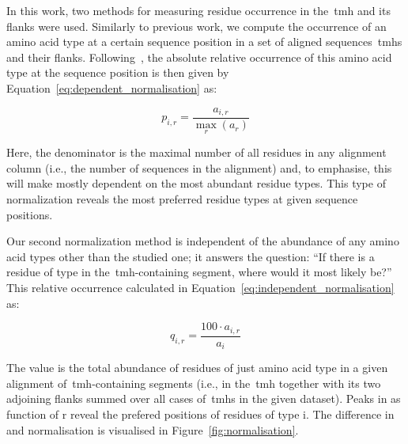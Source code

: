 In this work, two methods for measuring residue occurrence in the~\gls{tmh} and its flanks were used.
Similarly to previous work, we compute the occurrence  of an amino acid type  at a certain sequence position  in a set of aligned sequences~\gls{tmh}s and their flanks.
Following~\cite{Sharpe2010}, the absolute relative occurrence  of this amino acid type at the sequence position  is then given by Equation~\ref{eq:dependent_normalisation} as:

\begin{equation} \label{eq:dependent_normalisation}
  p_{i,r}=\frac{a_{i,r}}{\underset{r}{\max}{(a_r)}}
\end{equation}


Here, the denominator is the maximal number of all residues in any alignment column (i.e., the number of sequences in the alignment) and, to emphasise, this will make  mostly dependent on the most abundant residue types.
This type of normalization reveals the most preferred residue types at given sequence positions.

Our second normalization method is independent of the abundance of any amino acid types other than the studied one; it answers the question: ``If there is a residue of type  in the~\gls{tmh}-containing segment, where would it most likely be?'' This relative occurrence  calculated in Equation~\ref{eq:independent_normalisation} as:

 \begin{equation} \label{eq:independent_normalisation}
   q_{i,r}=\frac{{100}\cdot{a_{i,r}}}{a_i}
 \end{equation}

The value  is the total abundance of residues of just amino acid type  in a given alignment of~\gls{tmh}-containing segments (i.e., in the~\gls{tmh} together with its two adjoining flanks summed over all cases of~\gls{tmh}s in the given dataset).
Peaks in as function of r reveal the prefered positions of residues of type i.
The difference in   and   normalisation is visualised in Figure~\ref{fig:normalisation}.

